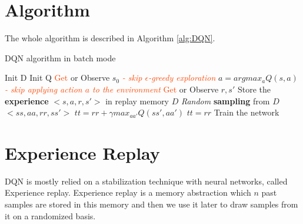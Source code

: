 \documentclass[12pt]{report}
\begin{document}
\section{Algorithm}
The whole algorithm is described in Algorithm \ref{alg:DQN}.

\begin{algorithm}[H]
\caption{DQN algorithm in batch mode}
\label{alg:DQN}
\begin{algorithmic}[1]
    \State Init D \Comment{\textcolor{BlueViolet}{replay memory}}
    \State Init Q \Comment{\textcolor{BlueViolet}{Q-table w/ random weights}}
    \State \textcolor{OrangeRed}{Get} or Observe $s_0$ \Comment{\textcolor{BlueViolet}{the initial state}}
            \State \textit{\textcolor{OrangeRed}{- skip $\epsilon$-greedy exploration}}
            \State $a = argmax_a Q(s,a)$
            \State \textit{\textcolor{OrangeRed}{- skip applying action $a$ to the environment}}
            \State \textcolor{OrangeRed}{Get} or Observe $r, s'$
            \State Store the \textbf{experience} $<s, a, r, s'>$ in replay memory $D$
            \State \textit{Random} \textbf{sampling} from $D$ $<ss, aa, rr, ss'>$  \Comment{\textcolor{BlueViolet}{[mini]-batch}}
             \Comment{\textcolor{BlueViolet}{target for each mini-batch}}
                \State $tt = rr + \gamma max_{aa'} Q(ss', aa')$
            \Else
                \State $tt = rr$
            \EndIf
            \State Train the network
        \EndFor    
    \EndFor
\end{algorithmic}
\end{algorithm}

\section{Experience Replay}
DQN is mostly relied on a stabilization technique with neural networks, called Experience replay. Experience replay is a memory abstraction which $n$ past samples are stored in this memory and then we use it later to draw samples from it on a randomized basis. 






\end{document}
